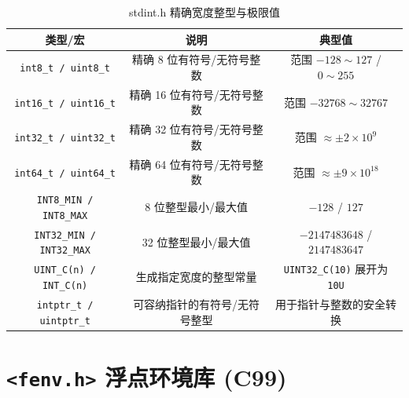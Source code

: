 \begin{table}[H]
\centering
\small
\renewcommand{\arraystretch}{1.5}
\begin{tabulary}{\linewidth}{CCC}
\toprule
\textbf{类型/宏} & \textbf{说明} & \textbf{典型值} \\ \midrule
\texttt{int8\_t / uint8\_t} & 精确 8 位有符号/无符号整数 & 范围 $-128 \sim 127$ / $0 \sim 255$ \\ 
\texttt{int16\_t / uint16\_t} & 精确 16 位有符号/无符号整数 & 范围 $-32768 \sim 32767$ \\ 
\texttt{int32\_t / uint32\_t} & 精确 32 位有符号/无符号整数 & 范围 $\approx \pm 2\times 10^9$ \\ 
\texttt{int64\_t / uint64\_t} & 精确 64 位有符号/无符号整数 & 范围 $\approx \pm 9\times 10^{18}$ \\ 
\texttt{INT8\_MIN / INT8\_MAX} & 8 位整型最小/最大值 & $-128$ / $127$ \\ 
\texttt{INT32\_MIN / INT32\_MAX} & 32 位整型最小/最大值 & $-2147483648$ / $2147483647$ \\ 
\texttt{UINT\_C(n) / INT\_C(n)} & 生成指定宽度的整型常量 & \texttt{UINT32\_C(10)} 展开为 \texttt{10U} \\ 
\texttt{intptr\_t / uintptr\_t} & 可容纳指针的有符号/无符号整型 & 用于指针与整数的安全转换 \\ \bottomrule
\end{tabulary}
\caption{stdint.h 精确宽度整型与极限值}
\label{tab:stdint}
\end{table}

\section{\texorpdfstring{\texttt{<fenv.h>} 浮点环境库 (C99)}{<fenv.h> 浮点环境库 (C99)}}

